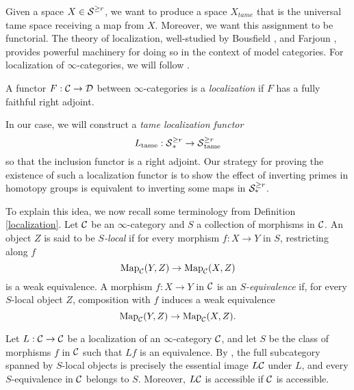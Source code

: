     
Given a space $X\in \operatorname{\mathcal{S}}^{\geq r}$, we want to produce a space $X_{tame}$ that is the universal tame space receiving a map from $X$. Moreover, we want this assignment to be functorial. The theory of localization, well-studied by Bousfield \cite{BousfieldSpaces}, \cite{BousfieldSpectra} and Farjoun \cite{Farjoun}, provides powerful machinery for doing so in the context of model categories.
For localization of $\infty$-categories, we will follow \cite{HTT}.
\begin{definition}
    \cite[Definition 5.2.7.2.]{HTT}
    A functor $F:{\mathcal{C}}\to {\mathcal{D}}$ between $\infty$-categories is a \emph{localization} if $F$ has a fully faithful right adjoint.
\end{definition}
In our case, we will construct a \emph{tame localization functor}
$$
L_{\operatorname{\operatorname{tame}}}: \operatorname{\mathcal{S}}^{\geq r}_* \to \operatorname{\mathcal{S}}^{\geq r}_{\operatorname{\operatorname{tame}}}
$$
so that the inclusion functor is a right adjoint.
Our strategy for proving the existence of such a localization functor is to show the effect of inverting primes in homotopy groups is equivalent to inverting some maps in ${\mathcal{S}}^{\geq r}_{*}$.

To explain this idea, we now recall some terminology from Definition \ref{localization}. 
Let ${\mathcal{C}}$ be an $\infty$-category and $S$ a collection of morphisms in ${\mathcal{C}}$.
An object $Z$ is said to be \emph{$S$-local} if for every morphism $f:X\to Y$ in $S$, restricting along $f$ 
$$
\operatorname{Map}_{{\mathcal{C}}}(Y,Z) \to \operatorname{Map}_{{\mathcal{C}}}(X,Z)
$$
is a weak equivalence.
A morphism $f:X\to Y$ in ${\mathcal{C}}$ is an \emph{$S$-equivalence} if, for every $S$-local object $Z$, composition with $f$ induces a weak equivalence 
$$
\operatorname{Map}_{{\mathcal{C}}}(Y,Z) \to \operatorname{Map}_{{\mathcal{C}}}(X,Z).
$$
\begin{remark}
    Let $L:{\mathcal{C}} \to {\mathcal{C}}$ be a localization of an $\infty$-category ${\mathcal{C}}$, and let $S$ be the class of morphisms $f$ in ${\mathcal{C}}$ such that $Lf$ is an equivalence.
    By \cite[Proposition 5.5.4.2.]{HTT}, the full subcategory spanned by $S$-local objects is precisely the essential image $L{\mathcal{C}}$ under $L$, and every $S$-equivalence in ${\mathcal{C}}$ belongs to $S$. Moreover,  $L{\mathcal{C}}$ is accessible if ${\mathcal{C}}$ is accessible.
\end{remark}

